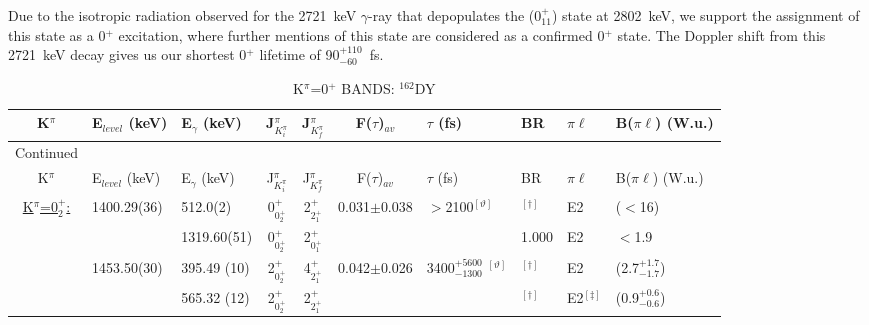 Due to the isotropic radiation observed for the 2721~keV $\gamma$-ray that depopulates the (0$^+_{11}$) state at 2802~keV, we support the assignment of this state as a 0$^+$ excitation, where further mentions of this state are considered as a confirmed 0$^+$ state. The Doppler shift from this 2721~keV decay gives us our shortest 0$^+$ lifetime of 90$^{+110}_{-60}$~fs.

\begin{landscape}
\begin{center}
\begin{longtable}{cllcccllll}
\caption{K$^\pi$=0$^+$ BANDS: $^{162}$DY \label{tab:162Dy_0s_all}}\\

K$^\pi$                         & E$_{level}$ (keV) & E$_\gamma$ (keV) & J$^\pi_{K^\pi_i}$ & J$^\pi_{K^\pi_f}$ & F($\tau$)$_{av}$ & $\tau$ (fs)                       & BR             & $\pi\ell$         & B($\pi\ell$) (W.u.) \\ \hline \hline \endfirsthead
\caption[]{K$^\pi$=0$^+$ BANDS: $^{162}$DY}{Continued}\\
K$^\pi$                         & E$_{level}$ (keV) & E$_\gamma$ (keV) & J$^\pi_{K^\pi_i}$ & J$^\pi_{K^\pi_f}$ & F($\tau$)$_{av}$ & $\tau$ (fs)                       & BR             & $\pi\ell$         & B($\pi\ell$) (W.u.) \\ \hline \hline \endhead
\underline{K$^\pi$=0$^+_2$:}    & 1400.29(36)  & 512.0(2)                   & 0$^+_{0^+_2}$    & 2$^+_{2^+_1}$ &0.031$\pm$0.038& $>$2100$^{[\vartheta]}$                 & $^{[\dagger]}$ & E2                & ($<$16) \\
                                &              & 1319.60(51)                & 0$^+_{0^+_2}$    & 2$^+_{0^+_1}$ &&                                                     & 1.000          & E2                & $<$1.9   \\
                                & 1453.50(30)  & 395.49 (10)                & 2$^+_{0^+_2}$    & 4$^+_{2^+_1}$ &0.042$\pm$0.026& 3400$^{+5600}_{-1300}$ $^{[\vartheta]}$ & $^{[\dagger]}$ & E2                & (2.7$^{+1.7}_{-1.7}$) \\
                                &              & 565.32 (12)                & 2$^+_{0^+_2}$    & 2$^+_{2^+_1}$ &&                                                     & $^{[\dagger]}$ & E2$^{[\ddagger]}$ & (0.9$^{+0.6}_{-0.6}$) \\

\end{longtable}
\end{center}
\end{landscape}
